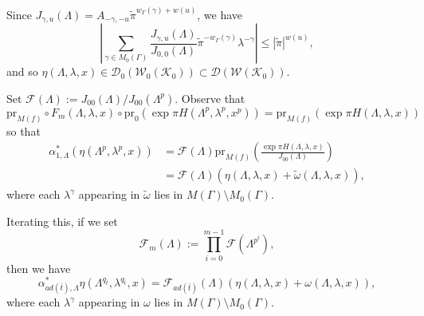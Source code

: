\documentclass{article}
\theoremstyle{remark}
\def\c #1{ {\mathcal #1} }
\begin{document}
Since $J_{\gamma, u}(\Lambda) = A_{-\gamma, -u} \tilde \pi^{w_\Gamma(\gamma) + w(u)}$, we have
\[
\left| \sum_{\gamma \in M_0(\Gamma)} \frac{J_{\gamma, u}(\Lambda)}{ J_{0,0}(\Lambda)} \tilde \pi^{-w_\Gamma(\gamma)} \lambda^{-\gamma} \right| \leq |\tilde \pi |^{w(u)},
\]
and so $\eta(\Lambda, \lambda, x) \in \c D_0(\c W_0(\c K_0)) \subset \c D( \c W(\c K_0))$. 


Set $\c F(\Lambda) := J_{00}(\Lambda) / J_{00}(\Lambda^p)$. Observe that 
 \[\text{pr}_{M(f)} \circ F_m(\Lambda,\lambda,x) \circ \text{pr}_0 (\exp \pi H(\Lambda^p,\lambda^p,x^p)) = \text{pr}_{M(f)}  (\exp \pi H(\Lambda,\lambda,x))
\]
so that
\begin{align*}
\alpha_{1, \Lambda}^*( \eta(\Lambda^p, \lambda^p, x) ) &= \c F(\Lambda) \text{pr}_{M(f)} \left( \frac{\exp \pi H(\Lambda, \lambda, x)}{J_{00}(\Lambda)} \right) \\
&= \c F(\Lambda) \left( \eta(\Lambda, \lambda, x)  + \tilde \omega (\Lambda, \lambda, x) \right),
\end{align*}
where each $\lambda^\gamma$ appearing in $\tilde \omega$ lies in $M(\Gamma) \setminus M_0(\Gamma)$. 


Iterating this, if we set
\[
\c F_m(\Lambda) := \prod_{i=0}^{m-1} \c F(\Lambda^{p^i}),
\]
then we have
\begin{equation}\label{E: first formula}
\alpha_{a d(\bar t), \Lambda}^* \eta(\Lambda^{q_{\bar t}}, \lambda^{q_{\bar t}}, x) = \c F_{a d(\bar t)}(\Lambda) \left( \eta(\Lambda, \lambda, x) + \omega(\Lambda, \lambda, x) \right),
\end{equation}
where each $\lambda^\gamma$ appearing in $\omega$ lies in $M(\Gamma) \setminus M_0(\Gamma)$. 
\end{document}
